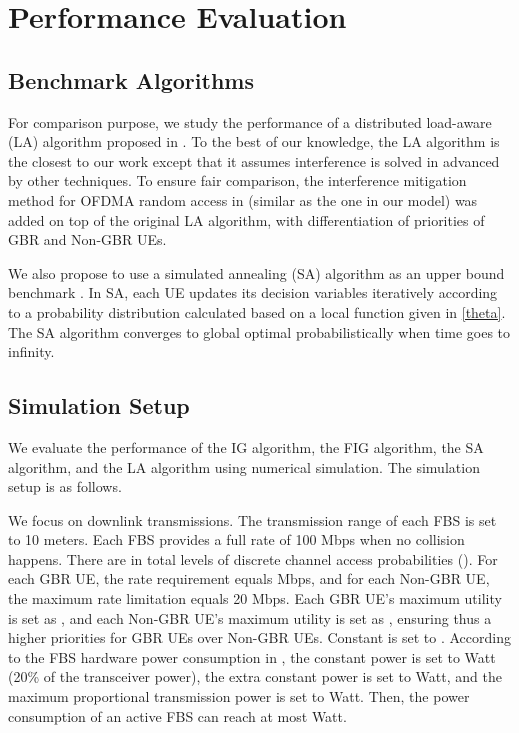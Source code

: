 \documentclass[conference]{IEEEtran}
\begin{document}
\section{Performance Evaluation}\label{simulation}

\subsection{Benchmark Algorithms}


For comparison purpose, we study the performance of a distributed load-aware (LA) algorithm proposed in \cite{zhou2009green}. To the best of our knowledge, the LA algorithm is the closest to our work except that it assumes interference is solved in advanced by other techniques. To ensure fair comparison, the interference mitigation method for OFDMA random access in \cite{hou2011proportionally} (similar as the one in our model) was added on top of the original LA algorithm, with differentiation of priorities of GBR and Non-GBR UEs.

We also propose to use a simulated annealing (SA) algorithm as an upper bound benchmark \cite{borst2014nonconcave}. In SA, each UE updates its decision variables iteratively according to a probability distribution calculated based on a local function given in \eqref{theta}. The SA algorithm converges to global optimal probabilistically when time goes to infinity.

\subsection{Simulation Setup}

We evaluate the performance of the IG algorithm, the FIG algorithm, the SA algorithm, and the LA algorithm using numerical simulation. The simulation setup is as follows.

We focus on downlink transmissions. The transmission range of each FBS is set to 10 meters. Each FBS provides a full rate of 100 Mbps when no collision happens. There are in total  levels of discrete channel access probabilities (). For each GBR UE, the rate requirement  equals  Mbps, and for each Non-GBR UE, the maximum rate limitation  equals 20 Mbps. Each GBR UE's maximum utility  is set as , and each Non-GBR UE's maximum utility  is set as , ensuring thus a higher priorities for GBR UEs over Non-GBR UEs. Constant  is set to . According to the FBS hardware power consumption in \cite{ashraf2011sleep}, the constant power  is set to  Watt (20\% of the transceiver power), the extra constant power  is set to  Watt, and the maximum proportional transmission power  is set to  Watt. Then, the power consumption of an active FBS can reach at most  Watt. 
\end{document}
